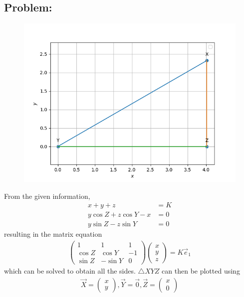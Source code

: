 \documentclass[10pt,a4paper]{report}
\newcommand{\myvec}[1]{\ensuremath{\begin{pmatrix}#1\end{pmatrix}}}
\begin{document}
\begin{multicols}{2}

\section{Problem:}  
\fi
	\begin{figure}[!h]
		\centering
 \includegraphics[width=\columnwidth]{chapters/9/11/2/4/figs/line.png}
		\caption{}
		\label{fig:9/11/2/4}
  	\end{figure}
	\solution From the given information, 
\begin{align}
	x+y+z &= K
	\\
	y\cos Z + z \cos Y -x &=0
	\\
	y\sin Z - z \sin Y &=0
\end{align}
resulting in the matrix equation
\begin{align}
	\myvec{
		1 & 1 & 1 
	\\
	\cos Z &  \cos Y &-1
	\\
	\sin Z &-  \sin Y & 0
}\myvec{x \\ y \\ z}
= K \vec{e}_1
\end{align}
which can be solved to obtain all the sides.  $\triangle XYZ$ can then be plotted using
\begin{align}
	\vec{X} = \myvec{x \\ y},
	\vec{Y} = \vec{0},
	\vec{Z} =\myvec{x \\ 0}
\end{align}
	\iffalse


\end{multicols}
\end{document}
